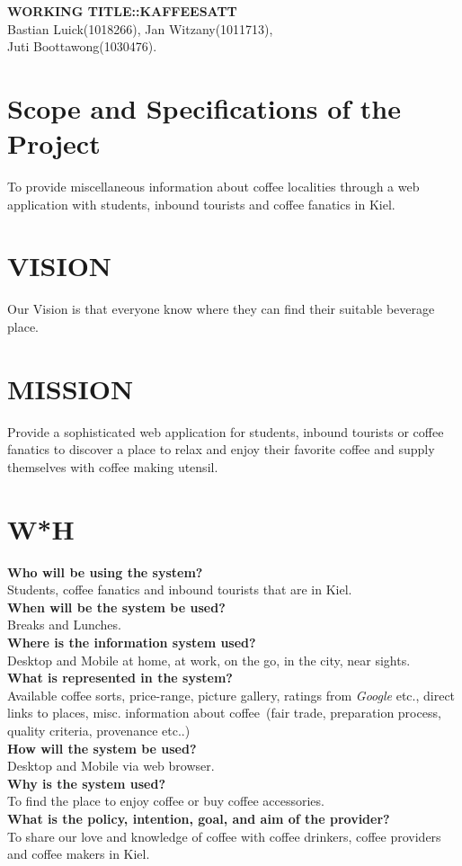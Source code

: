 \thispagestyle{empty}
\begin{center}
\Large{\textbf{WORKING TITLE::KAFFEESATT}}\\
Bastian Luick(1018266), Jan Witzany(1011713),\\ Juti Boottawong(1030476).
\end{center}
\vspace*{-0.5cm}
\section*{Scope and Specifications of the Project}
To provide miscellaneous information about coffee localities through a web application with students, inbound tourists and coffee fanatics in Kiel.
\vspace*{-0.5cm}
\section*{VISION}
Our Vision is that everyone know where they can find their suitable beverage place.
\vspace*{-0.5cm}
\section*{MISSION}
Provide a sophisticated web application for students, inbound tourists or coffee fanatics to discover a place to relax and enjoy their favorite coffee and supply themselves with coffee making utensil.
\vspace*{-0.5cm}
\section*{W*H}
\textbf{Who will be using the system?}\\
Students, coffee fanatics and inbound tourists that are in Kiel.\\
\textbf{When will be the system be used?}\\
Breaks and Lunches.\\
\textbf{Where is the information system used?}\\
Desktop and Mobile at home, at work, on the go, in the city, near sights.\\
\textbf{What is represented in the system?}\\
Available coffee sorts, price-range, picture gallery, ratings from \textit{Google} etc., direct links to places, misc. information about coffee~(fair trade, preparation process, quality criteria, provenance etc..)\\
\textbf{How will the system be used?}\\
Desktop and Mobile via web browser.\\
\textbf{Why is the system used?}\\
To find the place to enjoy coffee or buy coffee accessories.\\
\textbf{What is the policy, intention, goal, and aim of the provider?}\\
To share our love and knowledge of coffee with coffee drinkers, coffee providers and coffee makers in Kiel.
\vspace*{-0.5cm}
